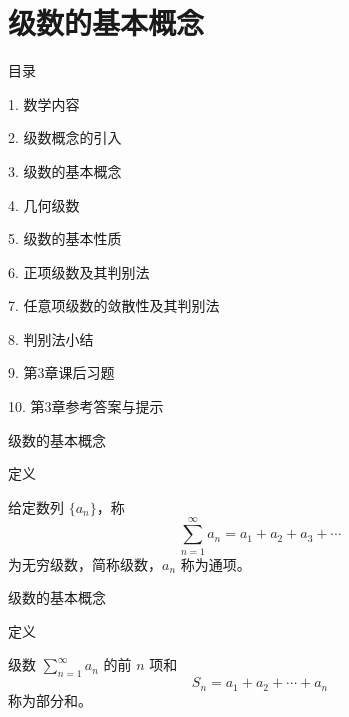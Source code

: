 \documentclass[aspectratio=169,10pt,fontset=fandol]{ctexbeamer}
\begin{document}
\section{级数的基本概念}
\begin{frame}[t,fragile]{目录}
\normalsize
{\color{black}\normalsize 1. 数学内容\par}\vspace{0.3em}
{\color{black}\normalsize 2. 级数概念的引入\par}\vspace{0.3em}
{\color{blue}\normalsize 3. 级数的基本概念\par}\vspace{0.3em}
{\color{gray!40}\normalsize 4. 几何级数\par}\vspace{0.3em}
{\color{gray!40}\normalsize 5. 级数的基本性质\par}\vspace{0.3em}
{\color{gray!40}\normalsize 6. 正项级数及其判别法\par}\vspace{0.3em}
{\color{gray!40}\normalsize 7. 任意项级数的敛散性及其判别法\par}\vspace{0.3em}
{\color{gray!40}\normalsize 8. 判别法小结\par}\vspace{0.3em}
{\color{gray!40}\normalsize 9. 第3章课后习题\par}\vspace{0.3em}
{\color{gray!40}\normalsize 10. 第3章参考答案与提示\par}\vspace{0.3em}
\end{frame}
\begin{frame}[t,fragile]{级数的基本概念}
\footnotesize
\begin{block}{定义}
{\footnotesize

给定数列 \(\{a_n\}\)，称
\[
\sum_{n=1}^{\infty} a_n = a_1 + a_2 + a_3 + \cdots
\]
为无穷级数，简称级数，\(a_n\) 称为通项。

}
\end{block}
\end{frame}
\begin{frame}[t,fragile]{级数的基本概念}
\footnotesize
\begin{block}{定义}
{\footnotesize

级数 \(\sum\limits_{n = 1}^{  \infty }  a_n\) 的前 \(n\) 项和
\[
S_n = a_1 + a_2 + \cdots + a_n
\]
称为部分和。

}
\end{block}
\end{frame}
\end{document}
